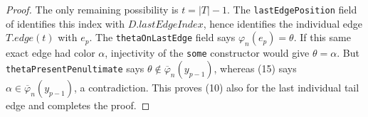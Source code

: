 \begin{proof}
The only remaining possibility is \(t=|T|-1\).  The
\texttt{lastEdgePosition} field of
 identifies this index with
\(D.\mathit{lastEdgeIndex}\), hence identifies the individual edge
\(T.\mathit{edge}(t)\) with \(e_p\).  The
\texttt{thetaOnLastEdge} field says \(\varphi_n(e_p)=\theta\).  If this
same exact edge had color \(\alpha\), injectivity of the \texttt{some}
constructor would give \(\theta=\alpha\).  But
\texttt{thetaPresentPenultimate} says
\(\theta\notin\overline\varphi_n(y_{p-1})\), whereas (15) says
\(\alpha\in\overline\varphi_n(y_{p-1})\), a contradiction.  This proves
(10) also for the last individual tail edge and completes the proof.
\end{proof}
